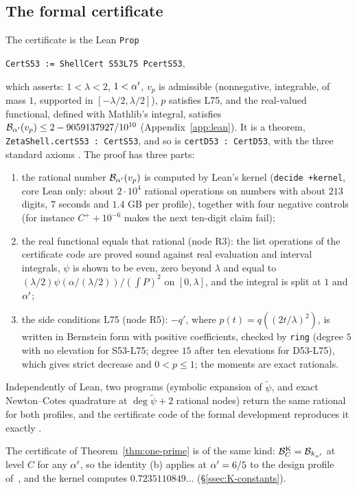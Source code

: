 \subsection{The formal certificate}
The certificate is the Lean \texttt{Prop}
\begin{center}
\texttt{CertS53 := ShellCert S53L75 PcertS53},
\end{center}
which asserts: $1<\lambda<2$, $1<\alpha'$, $v_p$ is admissible (nonnegative, integrable, of mass $1$, supported in $[-\lambda/2,\lambda/2]$), $p$ satisfies L75, and the real-valued
functional, defined with Mathlib's integral, satisfies $\mathcal B_{\alpha'}(v_p)\le2-9059137927/10^{10}$ (Appendix~\ref{app:lean}). It is a theorem,
\texttt{ZetaShell.certS53 : CertS53}, and so is \texttt{certD53 : CertD53}, with the three standard axioms \tagL. The proof has
three parts:
\begin{enumerate}[label=(\alph*)]
\item the rational number $\mathcal B_{\alpha'}(v_p)$ is computed by Lean's kernel (\texttt{decide +kernel}, core Lean only: about $2\cdot10^4$ rational operations on numbers
with about $213$ digits, $7$ seconds and $1.4$ GB per profile), together with four negative controls (for instance $C^++10^{-6}$ makes the next ten-digit claim
fail);
\item the real functional equals that rational (node R3): the list operations of the certificate code are proved sound against real evaluation and interval
integrals, $\psi$ is shown to be even, zero beyond $\lambda$ and equal to $(\lambda/2)\hat\psi(\alpha/(\lambda/2))/(\int P)^2$ on $[0,\lambda]$, and the integral is split at $1$ and
$\alpha'$;
\item the side conditions L75 (node R5): $-q'$, where $p(t)=q((2t/\lambda)^2)$, is written in Bernstein form with positive coefficients, checked by \texttt{ring} (degree $5$
with no elevation for S53-L75; degree $15$ after ten elevations for D53-L75), which gives strict decrease and $0<p\le1$; the moments are exact rationals.
\end{enumerate}
Independently of Lean, two programs (symbolic expansion of $\tilde\psi$, and exact Newton--Cotes quadrature at $\deg\tilde\psi+2$ rational nodes)
return the same rational for both profiles, and the certificate code of the formal development reproduces it exactly \tagN.

The certificate of Theorem~\ref{thm:one-prime} is of the same kind: $\mathcal B^{\rm K}_{C}=\mathcal B_{k_{\alpha'}}$ at level $C$ for any $\alpha'$, so the identity (b) applies at $\alpha'=6/5$
to the design profile of~\cite{DSouza}, and the kernel computes $0.7235110849\ldots$ (\S\ref{ssec:K-constants}).
